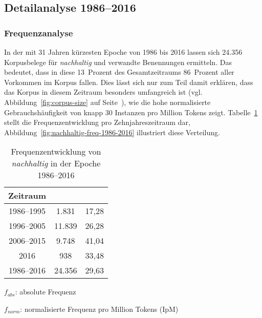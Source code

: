 \documentclass[
    german,
    a4paper,%
    12pt,%
    oneside,%
    toc=bibliography,
    final,
]{scrartcl}
\begin{document}
\subsection{Detailanalyse 1986–2016}
\label{subsec:detail-1986–2016}

\subsubsection{Frequenzanalyse}

In der mit 31 Jahren kürzesten Epoche von 1986 bis 2016 lassen sich 24.356 Korpusbelege für \textit{nachhaltig} und verwandte Benennungen ermitteln. Das bedeutet, dass in diese 13~Prozent des Gesamtzeitraums 86~Prozent aller Vorkommen im Korpus fallen. Dies lässt sich nur zum Teil damit erklären, dass das Korpus in diesem Zeitraum besonders umfangreich ist (vgl. Abbildung~\ref{fig:corpus-size} auf Seite~\pageref{fig:corpus-size}), wie die hohe normalisierte Gebrauchshäufigkeit von knapp 30 Instanzen pro Million Tokens zeigt. Tabelle~\ref{tab:freq-epoche4} stellt die Frequenzentwicklung pro Zehnjahreszeitraum dar, Abbildung~\ref{fig:nachhaltig-freq-1986-2016} illustriert diese Verteilung.

\begin{table}[h!]
	\centering
	\renewcommand{\arraystretch}{1.5}
	
	\caption{Frequenzentwicklung von \textit{nachhaltig} in der Epoche 1986–2016}
	\label{tab:freq-epoche4}
	
	\begin{threeparttable}
	
	\begin{tabular}{ccc}
	\textbf{Zeitraum} & \boldmath{$f_{abs}$} & \boldmath{$f_{norm}$} \\ \hline
	1986–1995 & 1.831 & 17,28 \\ \hline
	1996–2005 & 11.839 & 26,28 \\ \hline
	2006–2015 & 9.748 & 41,04 \\ \hline
	2016 & 938 & 33,48 \\ \hline
	1986–2016 & 24.356 & 29,63 \\ \hline
	\end{tabular} 
	
	\begin{tablenotes}
	\footnotesize
	\setlength{\itemindent}{-1.2em}
	\item $f_{abs}$: absolute Frequenz
	\item $f_{norm}$: normalisierte Frequenz pro Million Tokens (IpM)
	\end{tablenotes}
	
	\end{threeparttable}
\end{table}
\end{document}
